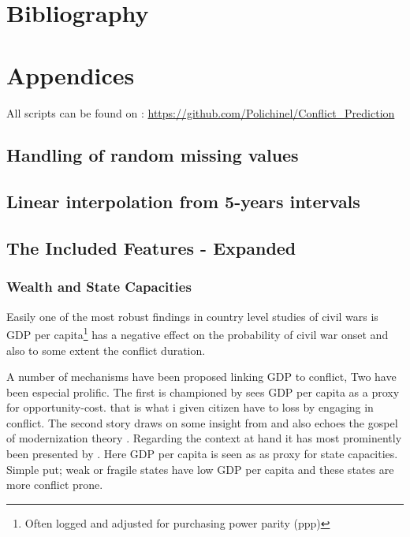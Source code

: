\documentclass[a4paper]{article}
\begin{document}

\pagebreak

\section{Bibliography}
 


\pagebreak
\section{Appendices}

All scripts can be found on : \hyperlink{https://github.com/Polichinel/Conflict_Prediction}{https://github.com/Polichinel/Conflict\_Prediction}

\subsection{Handling of random missing values}\label{missing}

\subsection{Linear interpolation from 5-years intervals}\label{interpolation}

\subsection{The Included Features - Expanded}\label{feature_expanded}


\subsubsection{Wealth and State Capacities}

 Easily one of the most robust findings in country level studies of civil wars is GDP per capita\footnote{Often logged and adjusted for purchasing power parity (ppp)} has a negative effect on the probability of civil war onset \citep{Collier_Hoeffler_1998, Fearon_Laitin_2003, Collier_Hoeffler_2004, Hegre_Sambanis_2006, Blattman_Miguel_2010} and also to some extent the conflict duration\citep{Fearon_2004, Hegre_Oestby_Raleigh_2009}.\par
 
 A number of mechanisms have been proposed linking GDP to conflict, Two have been especial prolific. The first is championed by \cite{Collier_Hoeffler_1998, Collier_Hoeffler_2004} sees GDP per capita as a proxy for opportunity-cost. that is what i given citizen have to loss by engaging in conflict. The second story draws on some insight from \cite{Skocpol_1979} and also echoes the gospel of modernization theory \citep{Lipset_1959}. Regarding the context at hand it has most prominently been presented by \cite{Fearon_Laitin_2003}. Here GDP per capita is seen as as proxy for state capacities. Simple put; weak or fragile states have low GDP per capita and these states are more conflict prone\citep[88]{Fearon_Laitin_2003}.\par
 
\end{document}

